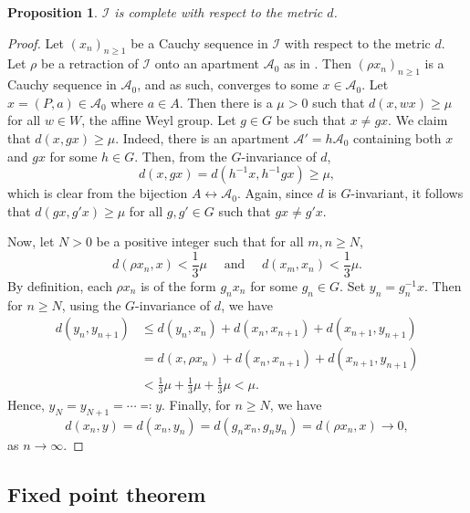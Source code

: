 \documentclass{article}
\theoremstyle{thmstyle}
\newtheorem{proposition}[theorem]{Proposition}
\theoremstyle{defstyle}
\newcommand{\scrA}{\mathscr{A}}
\newcommand{\scrI}{\mathscr{I}}
\renewcommand{\le}{\leqslant}
\renewcommand{\ge}{\geqslant}
\begin{document}
\begin{proposition}
    $\scrI$ is complete with respect to the metric $d$.
\end{proposition}
\begin{proof}
    Let $(x_n)_{n\ge 1}$ be a Cauchy sequence in $\scrI$ with respect to the metric $d$. Let $\rho$ be a retraction of $\scrI$ onto an apartment $\scrA_0$ as in . Then $\left(\rho x_n\right)_{n\ge 1}$ is a Cauchy sequence in $\scrA_0$, and as such, converges to some $x\in\scrA_0$. Let $x = (P, a)\in\scrA_0$ where $a\in A$. Then there is a $\mu > 0$ such that $d(x, wx)\ge\mu$ for all $w\in W$, the affine Weyl group. Let $g\in G$ be such that $x\ne gx$. We claim that $d(x, gx)\ge\mu$. Indeed, there is an apartment $\scrA' = h\scrA_0$ containing both $x$ and $gx$ for some $h\in G$. Then, from the $G$-invariance of $d$, 
    \begin{equation*}
        d(x, gx) = d(h^{-1}x, h^{-1}gx)\ge\mu,
    \end{equation*}
    which is clear from the bijection $A\leftrightarrow\scrA_0$. Again, since $d$ is $G$-invariant, it follows that $d(gx, g'x)\ge\mu$ for all $g,g'\in G$ such that $gx\ne g'x$.

    Now, let $N > 0$ be a positive integer such that for all $m,n\ge N$, 
    \begin{equation*}
        d(\rho x_n, x) < \frac{1}{3}\mu\quad\text{ and }\quad d(x_m, x_n) < \frac{1}{3}\mu.
    \end{equation*}
    By definition, each $\rho x_n$ is of the form $g_nx_n$ for some $g_n\in G$. Set $y_n = g_n^{-1}x$. Then for $n\ge N$, using the $G$-invariance of $d$, we have 
    \begin{align*}
        d(y_n, y_{n + 1}) &\le d(y_n, x_n) + d(x_n, x_{n + 1}) + d(x_{n + 1}, y_{n + 1})\\
        &= d(x, \rho x_n) + d(x_n, x_{n + 1}) + d(x_{n + 1}, y_{n + 1})\\
        &< \frac{1}{3}\mu + \frac{1}{3}\mu + \frac{1}{3}\mu < \mu.
    \end{align*}
    Hence, $y_N = y_{N + 1} = \cdots \eqcolon y$. Finally, for $n\ge N$, we have 
    \begin{equation*}
        d(x_n, y) = d(x_n, y_n) = d(g_nx_n, g_ny_n) = d(\rho x_n, x)\to 0,
    \end{equation*}
    as $n\to\infty$.
\end{proof}

\subsection*{Fixed point theorem}
\end{document}
